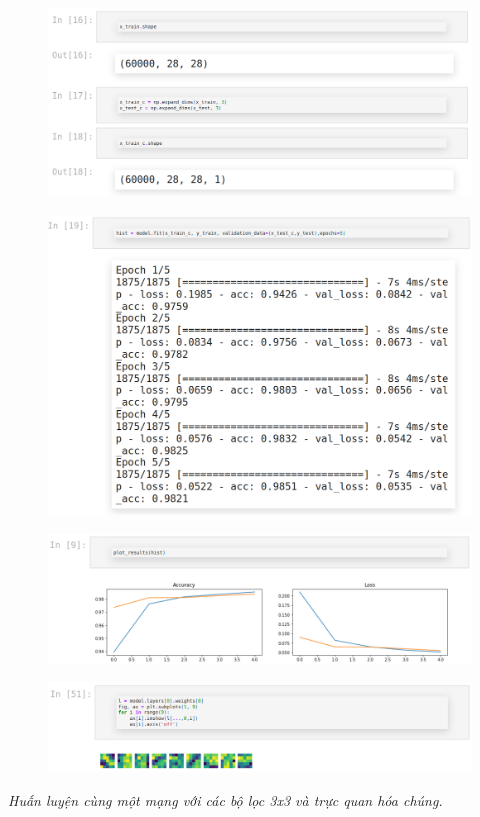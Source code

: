 \documentclass{book}
\begin{document}
\begin{figure}[H]
    \centering
    \includegraphics[width=1.0\linewidth]{images/code4.png}
    \label{fig:code4}
\end{figure}
\begin{figure}[H]
    \centering
    \includegraphics[width=1.0\linewidth]{images/code5.png}
    \label{fig:code5}
\end{figure}
\begin{figure}[H]
    \centering
    \includegraphics[width=1.0\linewidth]{images/code6.png}
    \label{fig:code6}
\end{figure}
\begin{figure}[H]
    \centering
    \includegraphics[width=1.0\linewidth]{images/code7.png}
    \label{fig:code7}
\end{figure}
\textit{Huấn luyện cùng một mạng với các bộ lọc 3x3 và trực quan hóa chúng.}
\end{document}
